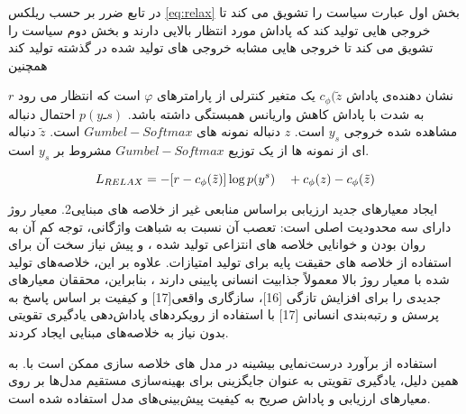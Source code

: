 \begin{enumerate}
{	  در تابع ضرر بر حسب ریلکس \ref{eq:relax}
	  بخش اول عبارت سیاست را تشویق می کند تا خروجی هایی تولید کند که پاداش مورد انتظار بالایی دارند و بخش دوم سیاست را تشویق می کند تا خروجی هایی مشابه خروجی های تولید شده در گذشته تولید کند همچنین
	  
	  $ r $
	  نشان دهنده‌ی پاداش 
	 $  c_\phi(\tilde{z} $
	 یک متغیر کنترلی از پارامترهای $ φ $ است که انتظار می رود به شدت با پاداش کاهش واریانس همبستگی داشته باشد.
	$  p(yـs) $ 
	احتمال دنباله مشاهده شده خروجی $ y_s $ است.
	 $ z $
	  دنباله نمونه های $Gumbel-Softmax  $ است.
	 $ \tilde{z} $
	  دنباله ای از نمونه ها از یک توزیع $ Gumbel-Softmax $ مشروط بر $ y_s $ است.
	  
	  \begin{equation}
	  \label{eq:relax}
	  L_\text{$ RELAX $} = -[r - c_\phi(\tilde{z})]   \log p(y^{s}) \quad + c_\phi(z) - c_\phi(\tilde{z})
	  \end{equation}
	
	  
	  

	
	
  ایجاد معیارهای جدید ارزیابی براساس منابعی غیر از خلاصه های مبنایی2. معیار روژ
   دارای سه محدودیت اصلی است: تعصب آن نسبت به شباهت واژگانی، توجه کم آن به روان بودن و خوانایی خلاصه های انتزاعی تولید شده ، و پیش نیاز سخت آن برای استفاده از خلاصه های حقیقت پایه برای تولید امتیازات. علاوه بر این، خلاصه‌های تولید شده با معیار روژ بالا معمولاً جذابیت انسانی پایینی دارند ، بنابراین، محققان معیارهای جدیدی را برای افزایش تازگی [16]، سازگاری واقعی[17] و کیفیت بر اساس
پاسخ به پرسش و رتبه‌بندی انسانی [17] با استفاده از رویکردهای پاداش‌دهی یادگیری تقویتی بدون نیاز به خلاصه‌های مبنایی ایجاد کردند.
}
\end{enumerate}


استفاده از برآورد درست‌نمایی بیشینه  در مدل های خلاصه سازی  ممکن است  با. به همین دلیل، یادگیری تقویتی به عنوان جایگزینی برای بهینه‌سازی مستقیم مدل‌ها بر روی معیارهای ارزیابی و پاداش صریح به کیفیت پیش‌بینی‌های مدل استفاده شده است. 
